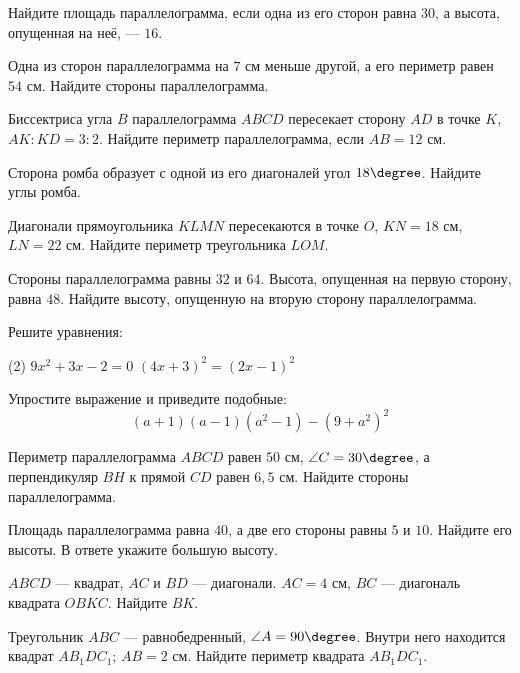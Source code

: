 \begin{exam}
	\begin{listofex}
		\item Найдите площадь параллелограмма, если одна из его сторон равна \( 30 \), а высота, опущенная на неё, --- \( 16 \).
		\item Одна из сторон параллелограмма на \( 7 \) см меньше другой, а его периметр равен \( 54 \) см. Найдите стороны параллелограмма.
		\item Биссектриса угла \( B \) параллелограмма \( ABCD \) пересекает сторону \( AD \) в точке \( K \), \( AK:KD=3:2 \). Найдите периметр параллелограмма, если \( AB=12 \) см.
		\item Сторона ромба образует с одной из его диагоналей угол \( 18\degree \). Найдите углы ромба.
		\item Диагонали прямоугольника \( KLMN \) пересекаются в точке \( O \), \( KN=18 \) см, \( LN=22 \) см. Найдите периметр треугольника \( LOM \).
		\item Стороны параллелограмма равны \( 32 \) и \( 64 \). Высота, опущенная на первую сторону, равна \( 48 \). Найдите высоту, опущенную на вторую сторону параллелограмма.
		\item Решите уравнения:
		\begin{tasks}(2)
			\task \( 9x^2+3x-2=0 \)
			\task \( (4x+3)^2=(2x-1)^2 \)
		\end{tasks}
		\item Упростите выражение и приведите подобные: \\ \[ (a+1)(a-1)(a^2-1)-(9+a^2)^2 \]
	\end{listofex}
\end{exam}

\begin{consultation}
	\begin{listofex}
		\item Периметр параллелограмма \( ABCD \) равен \( 50 \) см, \( \angle C = 30\degree \), а перпендикуляр \( BH \) к прямой \( CD \) равен \( 6,5 \) см. Найдите стороны параллелограмма.
		\item Площадь параллелограмма равна \( 40 \), а две его стороны равны \( 5 \) и \( 10 \). Найдите его высоты. В ответе укажите большую высоту.
		\item \( ABCD \) --- квадрат, \( AC \) и \( BD \) --- диагонали. \( AC = 4  \) см, \( BC \) --- диагональ квадрата \( OBKC \).  Найдите \( BK \).
		\item Треугольник \( ABC \) --- равнобедренный, \( \angle A=90\degree \). Внутри него находится квадрат \( AB_1DC_1 \); \( AB = 2 \) см. Найдите периметр квадрата \( AB_1DC_1  \).
	\end{listofex}
\end{consultation}

